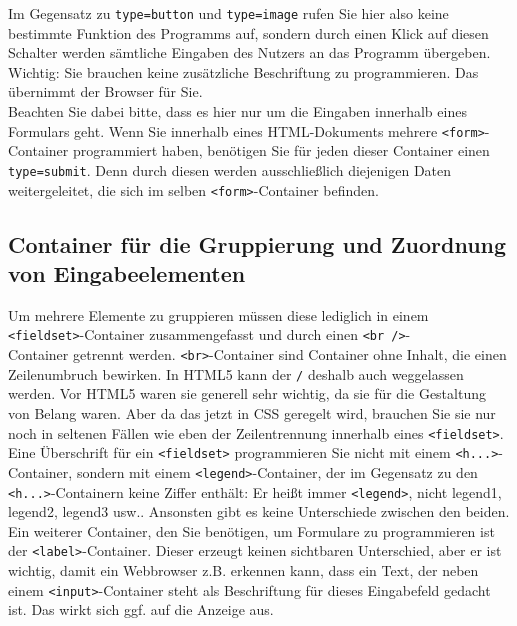 \begin{itemize}
	Im Gegensatz zu \verb|type=button| und \verb|type=image| rufen Sie hier also keine bestimmte Funktion des Programms auf, sondern durch einen Klick auf diesen Schalter werden sämtliche Eingaben des Nutzers an das Programm übergeben.\\
	
	Wichtig: Sie brauchen keine zusätzliche Beschriftung zu programmieren. Das übernimmt der Browser für Sie.\\
	
	Beachten Sie dabei bitte, dass es hier nur um die Eingaben innerhalb eines Formulars geht. Wenn Sie innerhalb eines HTML-Dokuments mehrere \verb|<form>|-Container programmiert haben, benötigen Sie für jeden dieser Container einen \verb|type=submit|. Denn durch diesen werden ausschließlich diejenigen Daten weitergeleitet, die sich im selben \verb|<form>|-Container befinden.
\end{itemize}

\subsection{Container für die Gruppierung und Zuordnung von Eingabeelementen}

Um mehrere Elemente zu gruppieren müssen diese lediglich in einem\\ \verb|<fieldset>|-Container zusammengefasst und durch einen \verb|<br />|-\\Container getrennt werden. \verb|<br>|-Container sind Container ohne Inhalt, die einen Zeilenumbruch bewirken. In HTML5 kann der \verb|/| deshalb auch weggelassen werden. Vor HTML5 waren sie generell sehr wichtig, da sie für die Gestaltung von Belang waren. Aber da das jetzt in CSS geregelt wird, brauchen Sie sie nur noch in seltenen Fällen wie eben der Zeilentrennung innerhalb eines \verb|<fieldset>|.\\

Eine Überschrift für ein \verb|<fieldset>| programmieren Sie nicht mit einem \verb|<h...>|-Container, sondern mit einem \verb|<legend>|-Container, der im Gegensatz zu den \verb|<h...>|-Containern keine Ziffer enthält: Er \glqq{}heißt\grqq{} immer \verb|<legend>|, nicht legend1, legend2, legend3 usw.. Ansonsten gibt es keine Unterschiede zwischen den beiden.\\

Ein weiterer Container, den Sie benötigen, um Formulare zu programmieren ist der \verb|<label>|-Container. Dieser erzeugt keinen sichtbaren Unterschied, aber er ist wichtig, damit ein Webbrowser z.B. erkennen kann, dass ein Text, der neben einem \verb|<input>|-Container steht als Beschriftung für dieses Eingabefeld gedacht ist. Das wirkt sich ggf. auf die Anzeige aus.\\

